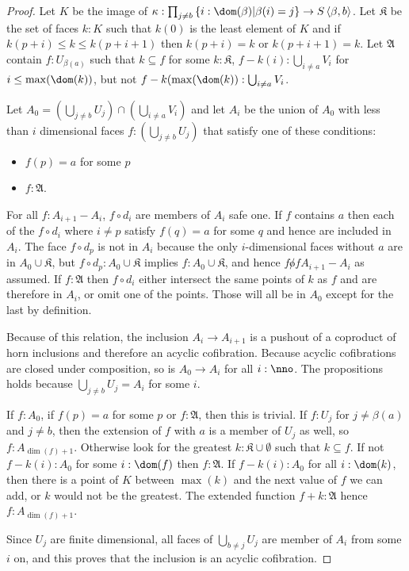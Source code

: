 \documentclass{tac}
\newcommand\set[1]{\left\{#1\right\}}
\newcommand\of{:}
\newcommand\tuplet[1]{\left\langle #1 \right\rangle}
\begin{document}
\begin{proof}
Let $K$ be the image of $\kappa\of \prod_{j\neq b}\set{i\of\dom(\beta)|\beta(i)=j} \to S\tuplet{\beta,b}$. 
Let $\mathfrak K$ be the set of faces $k\of K$ such that $k(0)$ is the least element of $K$ and if $k(p+i) \leq k \leq k(p+i+1)$ then $k(p+i)=k$ or $k(p+i+1) = k$.
Let $\mathfrak A$ contain $f\of U_{\beta(a)}$ such that $k\subseteq f$ for some $k\of \mathfrak K$, $f - k(i) \of \bigcup_{i\neq a} V_i$ for $i \leq \max(\dom(k))$, but not $f - k(\max(\dom(k)) \of \bigcup_{i\neq a} V_i$.

Let $A_0 = (\bigcup_{j\neq b} U_j) \cap (\bigcup_{i\neq a} V_i)$ and let $A_{i}$ be the union of $A_0$ with less than $i$ dimensional faces $f\of (\bigcup_{j\neq b} U_j)$ that satisfy one of these conditions:
\begin{itemize}
\item $f(p) = a$ for some $p$
\item $f\of \mathfrak A$.
\end{itemize}

For all $f\of A_{i+1} - A_i$, $f\circ d_i$ are members of $A_i$ safe one. If $f$ contains $a$ then each of the $f\circ d_i$ where $i\neq p$ satisfy $f(q) = a$ for some $q$ and hence are included in $A_i$. The face $f\circ d_p$ is not in $A_i$ because the only $i$-dimensional faces without $a$ are in $A_0\cup\mathfrak K$, but $f\circ d_p \of A_0\cup\mathfrak K$ implies $f\of A_0\cup\mathfrak K$, and hence $f\not of A_{i+1} - A_i$ as assumed.
If $f\of\mathfrak A$ then $f\circ d_i$ either intersect the same points of $k$ as $f$ and are therefore in $A_i$, or omit one of the points. Those will all be in $A_0$ except for the last by definition.

Because of this relation, the inclusion $A_i\to A_{i+1}$ is a pushout of a coproduct of horn inclusions and therefore an acyclic cofibration. Because acyclic cofibrations are closed under composition, so is $A_0\to A_i$ for all $i\of \nno$.
The propositions holds because $\bigcup_{j\neq b} U_j = A_{i}$ for some $i$.

If $f\of A_0$, if $f(p) = a$ for some $p$ or $f\of \mathfrak A$, then this is trivial.
If $f\of U_j$ for $j\neq \beta(a)$ and $j\neq b$, then the extension of $f$ with $a$ is a member of $U_j$ as well, so $f\of A_{\dim(f)+1}$.
Otherwise look for the greatest $k\of\mathfrak K\cup{\emptyset}$ such that $k\subseteq f$. If not $f - k(i)\of A_0$ for some $i\of \dom(f)$ then $f\of \mathfrak A$. If $f - k(i)\of A_0$ for all $i\of\dom(k)$, then there is a point of $K$ between $\max(k)$ and the next value of $f$ we can add, or $k$ would not be the greatest. The extended function $f + k\of\mathfrak A$ hence $f\of A_{\dim(f)+1}$.

Since $U_j$ are finite dimensional, all faces of $\bigcup_{b\neq j} U_j$ are member of $A_i$ from some $i$ on, and this proves that the inclusion is an acyclic cofibration.
\end{proof}
\end{document}
